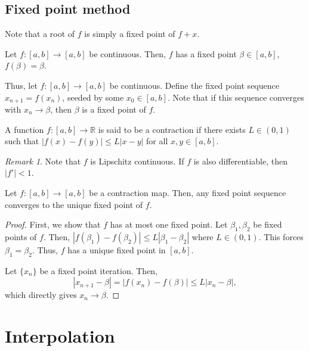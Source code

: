 \documentclass[11pt]{article}
\newcommand{\R}{\mathbb{R}}
\theoremstyle{definition}
\theoremstyle{remark}
\newtheorem*{remark}{Remark}
\numberwithin{equation}{section}
\begin{document}
    \subsection{Fixed point method}
    Note that a root of $f$ is simply a fixed point of $f + x$.

    \begin{theorem}
        Let $f\colon [a, b] \to [a, b]$ be continuous. Then, $f$ has a fixed point
        $\beta \in [a, b]$, $f(\beta) = \beta$.
    \end{theorem}
    
    Thus, let $f\colon [a, b] \to [a, b]$ be continuous. Define the fixed point
    sequence $x_{n + 1} = f(x_n)$, seeded by some $x_0 \in [a, b]$. Note that if this
    sequence converges with $x_n \to \beta$, then $\beta$ is a fixed point of $f$.

    \begin{definition}
        A function $f\colon [a, b] \to \R$ is said to be a contraction if there
        exists $L \in (0, 1)$ such that $|f(x) - f(y)| \leq L|x - y|$ for all $x,
        y\in [a, b]$.
        \begin{remark}
            Note that $f$ is Lipschitz continuous. If $f$ is also differentiable,
            then $|f'| < 1$.
        \end{remark}
    \end{definition}
    
    \begin{theorem}
        Let $f\colon [a, b] \to [a, b]$ be a contraction map. Then, any fixed point
        sequence converges to the unique fixed point of $f$.
    \end{theorem}
    \begin{proof}
        First, we show that $f$ has at most one fixed point. Let $\beta_1, \beta_2$
        be fixed points of $f$. Then, $|f(\beta_1) - f(\beta_2)| \leq L|\beta_1 -
        \beta_2|$ where $L \in (0, 1)$. This forces $\beta_1 = \beta_2$. Thus, $f$
        has a unique fixed point in $[a, b]$.

        Let $\{x_n\}$ be a fixed point iteration. Then, \[
            |x_{n + 1} - \beta| = |f(x_n) - f(\beta)| \leq L |x_n - \beta|,
        \] which directly gives $x_n \to \beta$.
    \end{proof}


    \section{Interpolation}
\end{document}
